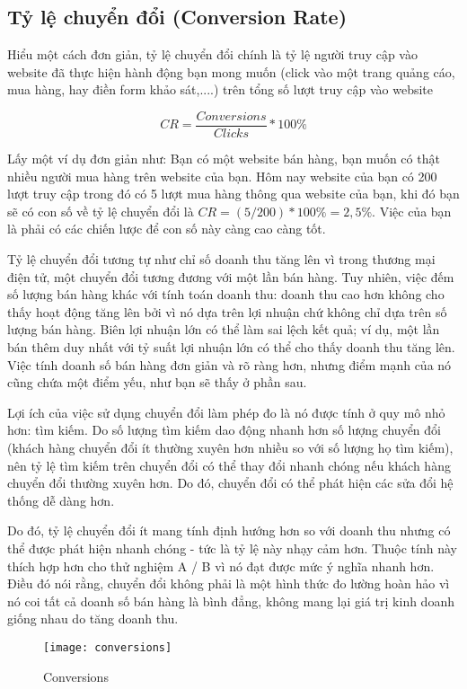 \subsection{Tỷ lệ chuyển đổi (Conversion Rate)}

Hiểu một cách đơn giản, tỷ lệ chuyển đổi chính là tỷ lệ người truy cập vào website đã thực hiện hành động bạn mong muốn (click vào một trang quảng cáo, mua hàng, hay điền form khảo sát,....) trên tổng số lượt truy cập vào website

\begin{displaymath}
	CR = \frac{Conversions}{Clicks} * 100\%
\end{displaymath}

Lấy một ví dụ đơn giản như: Bạn có một website bán hàng, bạn muốn có thật nhiều người mua hàng trên website của bạn. Hôm nay website của bạn có 200 lượt truy cập trong đó có 5 lượt mua hàng thông qua website của bạn, khi đó bạn sẽ có con số về tỷ lệ chuyển đổi là $CR = (5/200) * 100\% = 2,5\%$. Việc của bạn là phải có các chiến lược để con số này càng cao càng tốt.

Tỷ lệ chuyển đổi tương tự như chỉ số doanh thu tăng lên vì trong thương mại điện tử, một chuyển đổi tương đương với một lần bán hàng. Tuy nhiên, việc đếm số lượng bán hàng khác với tính toán doanh thu: doanh thu cao hơn không cho thấy hoạt động tăng lên bởi vì nó dựa trên lợi nhuận chứ không chỉ dựa trên số lượng bán hàng. Biên lợi nhuận lớn có thể làm sai lệch kết quả; ví dụ, một lần bán thêm duy nhất với tỷ suất lợi nhuận lớn có thể cho thấy doanh thu tăng lên. Việc tính doanh số bán hàng đơn giản và rõ ràng hơn, nhưng điểm mạnh của nó cũng chứa một điểm yếu, như bạn sẽ thấy ở phần sau.

Lợi ích của việc sử dụng chuyển đổi làm phép đo là nó được tính ở quy mô nhỏ hơn: tìm kiếm. Do số lượng tìm kiếm dao động nhanh hơn số lượng chuyển đổi (khách hàng chuyển đổi ít thường xuyên hơn nhiều so với số lượng họ tìm kiếm), nên tỷ lệ tìm kiếm trên chuyển đổi có thể thay đổi nhanh chóng nếu khách hàng chuyển đổi thường xuyên hơn. Do đó, chuyển đổi có thể phát hiện các sửa đổi hệ thống dễ dàng hơn.

Do đó, tỷ lệ chuyển đổi ít mang tính định hướng hơn so với doanh thu nhưng có thể được phát hiện nhanh chóng - tức là tỷ lệ này nhạy cảm hơn. Thuộc tính này thích hợp hơn cho thử nghiệm A / B vì nó đạt được mức ý nghĩa nhanh hơn. Điều đó nói rằng, chuyển đổi không phải là một hình thức đo lường hoàn hảo vì nó coi tất cả doanh số bán hàng là bình đẳng, không mang lại giá trị kinh doanh giống nhau do tăng doanh thu.
\begin{figure}[ht]
	\centering
	\texttt{[image: conversions]}
	\caption{Conversions}
\end{figure}

